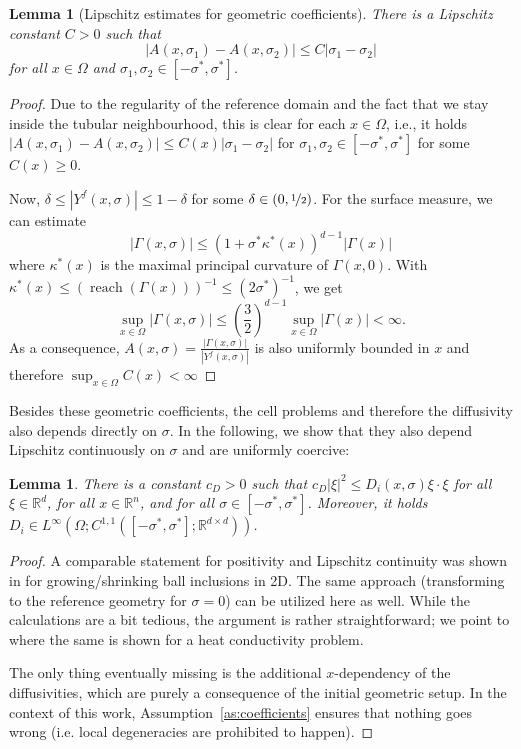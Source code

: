 \documentclass[reqno, 11pt]{amsart}
\newtheorem{lem}[thm]{Lemma}
\numberwithin{equation}{section}
\def\R{{\Bbb R}}
\def\R{{\mathbb R}}
\newcommand{\reach}{\operatorname{reach}}
\begin{document}
\begin{lem}[Lipschitz estimates for geometric coefficients]\label{lemma:lipschitz_coefficient}
    There is a Lipschitz constant $C>0$ such that
    \[
    |A(x,\sigma_1)-A(x,\sigma_2)|\leq C|\sigma_1-\sigma_2|
    \]
    for all $x\in\Omega$ and $\sigma_1,\sigma_2\in[-\sigma^*,\sigma^*]$.
\end{lem}
\begin{proof}
    Due to the regularity of the reference domain and the fact that we stay inside the tubular neighbourhood, this is clear for each $x\in\Omega$, i.e., it holds
    \(
    |A(x,\sigma_1)-A(x,\sigma_2)|\leq C(x)|\sigma_1-\sigma_2|
    \)
    for $\sigma_1,\sigma_2\in[-\sigma^*,\sigma^*]$ for some $C(x)\ge0$.
    
    Now, $\delta\le |Y^f(x,\sigma)|\le 1-\delta$ for some $\delta\in(0,\nicefrac12)$.
    For the surface measure, we can estimate 
    \[
    |\Gamma(x,\sigma)|\le(1+\sigma^*\kappa^*(x))^{d-1}|\Gamma(x)|
    \]
    where $\kappa^*(x)$ is the maximal principal curvature of $\Gamma(x,0)$.
    With $\kappa^*(x)\le(\reach(\Gamma(x)))^{-1}\le(2\sigma^*)^{-1}$, we get
    \[
    \sup_{x\in\Omega}|\Gamma(x,\sigma)|\le \left(\frac32\right)^{d-1}\sup_{x\in\Omega}|\Gamma(x)|<\infty.
    \]
    As a consequence, $A(x,\sigma)=\frac{|\Gamma(x,\sigma)|}{|Y^f(x,\sigma)|}$ is also uniformly bounded in $x$ and therefore $\sup_{x\in\Omega}C(x)<\infty$
\end{proof}

Besides these geometric coefficients, the cell problems and therefore the diffusivity also depends directly on $\sigma$.
In the following, we show that they also depend Lipschitz continuously on $\sigma$ and are uniformly coercive:

\begin{lem}\label{lemma:lipschitz.diffusivity}
There is a constant $c_D>0$ such that
%
$
c_D|\xi|^2\leq D_i(x,\sigma)\xi\cdot\xi
$
for all $\xi\in\R^d$, for all $x\in\R^n$, and for all $\sigma\in[-\sigma^*,\sigma^*]$.
Moreover, it holds $D_i\in L^\infty(\Omega;C^{1,1}([-\sigma^*,\sigma^*];\R^{d\times d}))$.
\end{lem}
\begin{proof}
    A comparable statement for positivity and Lipschitz continuity was shown in \cite[Lemma 4 and Lemma 8]{EdenNikolopoulosMuntean22} for growing/shrinking ball inclusions in 2D.
    The same approach (transforming to the reference geometry for $\sigma=0$) can be utilized here as well.
    While the calculations are a bit tedious, the argument is rather straightforward; we point to \cite[Lemma 3 and Lemma 7]{EdenFreudenbergMuntean2025} where the same is shown for a heat conductivity problem.

    The only thing eventually missing is the additional $x$-dependency of the diffusivities, which are purely a consequence of the initial geometric setup.
    In the context of this work, Assumption~\eqref{as:coefficients} ensures that nothing goes wrong (i.e. local degeneracies are prohibited to happen).
\end{proof}
\end{document}
